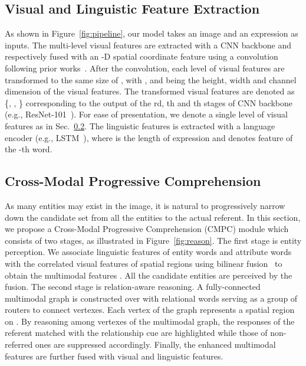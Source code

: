 \documentclass[10pt,twocolumn,letterpaper]{article}
\begin{document}
\subsection{Visual and Linguistic Feature Extraction}
\vspace{-1mm}

As shown in Figure~\ref{fig:pipeline}, our model takes an image and an expression as inputs. 
The multi-level visual features are extracted with a CNN backbone and respectively fused with an -D 
spatial coordinate feature  using a  convolution 
following prior works~\cite{liu2017recurrent}\cite{ye2019cross}. 
After the convolution, each level of visual features are transformed to the 
same size of , 
with ,  and  being the height, width and channel dimension of the visual features. 
The transformed visual features are denoted as \{, , \} corresponding to the output of 
the rd, th and th stages of CNN backbone (e.g., ResNet-101~\cite{he2016deep}).
For ease of presentation, we denote a single level of visual features as  in Sec.~\ref{sec:cmpc}. 
The linguistic features  is extracted with a language 
encoder (e.g., LSTM~\cite{hochreiter1997long}), where  is the length 
of expression and  denotes 
feature of the -th word.

\subsection{Cross-Modal Progressive Comprehension}
\label{sec:cmpc}
\vspace{-1mm}

As many entities may exist in the image, it is natural to progressively narrow down the candidate set 
from all the entities to the actual referent. 
In this section, we propose a Cross-Modal Progressive Comprehension (CMPC) module which consists of 
two stages, as illustrated in Figure~\ref{fig:reason}. 
The first stage is entity perception. We associate linguistic features of entity words and attribute words 
with the correlated visual features of spatial regions using bilinear fusion~\cite{BenMUTAN} to obtain the multimodal 
features . All the candidate entities are perceived by the fusion. 
The second stage is relation-aware reasoning. A fully-connected multimodal graph is constructed 
over  with relational words serving as a group of routers to connect vertexes.
Each vertex of the graph represents a spatial region on .
By reasoning among vertexes of the multimodal graph, the responses of the referent
 matched with the relationship cue are highlighted while those of non-referred 
ones are suppressed accordingly.
Finally, the enhanced multimodal features  are further fused with visual and linguistic features.
\end{document}
